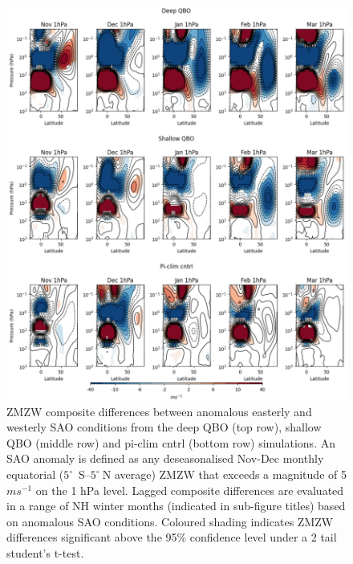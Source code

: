 \begin{figure}[h!]
\begin{center}
\noindent\includegraphics[width = 0.8\linewidth]{Figures/Figures-deepQBO/SAO_composites_combined.png}
\caption[ZMZW composites under easterly and westerly SAO anomalies]{ZMZW composite differences between anomalous easterly and westerly SAO conditions from the deep QBO (top row), shallow QBO (middle row) and pi-clim cntrl (bottom row) simulations. An SAO anomaly is defined as any deseasonalised Nov-Dec monthly equatorial ($5^{\circ}$\ S--$5^{\circ}\ $N average) ZMZW that exceeds a magnitude of 5 $ms^{-1}$ on the 1 hPa level. Lagged composite differences are evaluated in a range of NH winter months (indicated in sub-figure titles) based on anomalous SAO conditions. Coloured shading indicates ZMZW differences significant above the 95\% confidence level under a 2 tail student’s t-test.}
\label{fig:SAO_comp_1hPa}
\end{center}
\end{figure}



